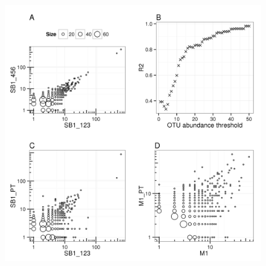 \documentclass[]{msu-thesis}
\begin{document}
\begin{figure}[tbph!]
  \centering
  \includegraphics[scale=1]{figs/chap2_figS4}
\end{figure}
\clearpage
\SingleSpacing
\end{document}
